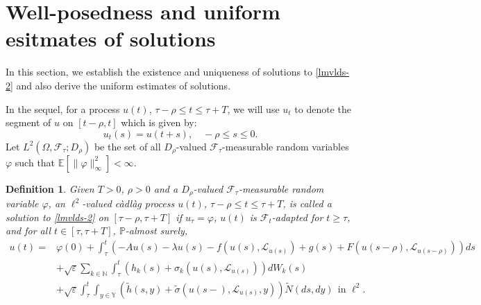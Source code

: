 \documentclass[11pt]{article}
\numberwithin{equation}{section}
\theoremstyle{plain}
\newtheorem{definition}{Definition}[section]
\begin{document}
 
\section{Well-posedness and uniform esitmates of solutions} \label{3}

 In this section, 
 we establish  the existence and uniqueness of solutions to \eqref{lmvlds-2} 
 and also derive the  uniform estimates of solutions.
 
 In the sequel, 
 for a process  $u(t)$,
 $\tau -\rho \le t \le \tau +T$,
 we will use $u_t$ to denote the segment of $u$ on $[t-\rho, t]$ which is given by:
 $$ u_t (s) = u(t+s), \quad -\rho \le s \le 0.
 $$
 Let
 $L^2( \Omega, \mathcal{F}_\tau;  D_{\rho} )$ be the set of all $D_{\rho}$-valued 
 $\mathcal{F}_\tau$-measurable random variables  $\varphi$ such that
 $\mathbb{E} \left[ \|\varphi\|^2_\infty \right] < \infty$.
 
 
\begin{definition}\label{def-sol}
  Given  $T>0$, $\rho > 0$ and 
  a  $D_{\rho}$-valued 
  $\mathcal{F}_\tau$-measurable 
   random variable $\varphi$,
   an $\ell^2$-valued
    c\`{a}dl\`{a}g process $u(t)$,
    $\tau -\rho \le t \le \tau +T$,
   is called a solution to \eqref{lmvlds-2} on
    $[\tau-\rho, \tau+T]$ if
    $u_\tau = \varphi$, 
   $u (t)$ is  $\mathcal{F}_t$-adapted
   for $t\ge \tau$, and
   for all $t \in [\tau, \tau+T]$, 
    $ \mathbb{P} $-almost surely,
   \begin{align*}
       u(t) = & \varphi(0)
                + \int_{\tau}^{t}
                     \left( - Au(s) - \lambda u(s)
                            - f(u(s), \mathcal{L}_{u(s)})
                            + g(s)
                            + F( u(s - \rho), \mathcal{L}_{u(s - \rho)} )
                     \right)ds \\
              & + \sqrt{\varepsilon}\sum_{k \in \mathbb{N} }
                     \int_{\tau}^{t}
                        \left( h_k(s) + \sigma_k(u(s),\mathcal{L}_{u(s)}) \right) dW_k(s) \\
              & + \sqrt{\varepsilon} 
                     \int_{\tau}^{t}\int_{
                     y\in \mathbb{Y} }
                        \left( \widetilde{h}(s,y) + \widetilde{\sigma}(u(s-),\mathcal{L}_{u(s)},y)
                        \right) \widetilde{N}(ds,dy)
                        \ \ \text{in }  \ell^2 .
   \end{align*}
 \end{definition}
\end{document}
